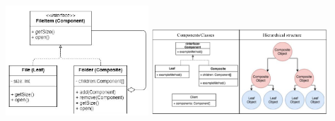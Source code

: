 \begin{center}
    \includegraphics[width=0.4\textwidth]{./composite1}
    \includegraphics[width=0.5\textwidth]{./composite2}
\end{center}
